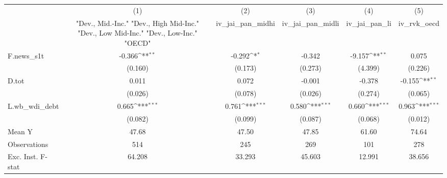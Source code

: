 {
\def\sym#1{\ifmmode^{#1}\else\(^{#1}\)\fi}
\begin{tabular}{l*{5}{c}}
\toprule
            &\multicolumn{1}{c}{(1)}&\multicolumn{1}{c}{(2)}&\multicolumn{1}{c}{(3)}&\multicolumn{1}{c}{(4)}&\multicolumn{1}{c}{(5)}\\
            &\multicolumn{1}{c}{ "Dev., Mid.-Inc." "Dev., High Mid-Inc." "Dev., Low Mid-Inc." "Dev., Low-Inc." "OECD" }&\multicolumn{1}{c}{iv\_jai\_pan\_midhi}&\multicolumn{1}{c}{iv\_jai\_pan\_midli}&\multicolumn{1}{c}{iv\_jai\_pan\_li}&\multicolumn{1}{c}{iv\_rvk\_oecd}\\
\midrule
F.news\_s1t  &      -0.366\sym{**} &      -0.292\sym{*}  &      -0.342         &      -9.157\sym{**} &       0.075         \\
            &     (0.160)         &     (0.173)         &     (0.273)         &     (4.399)         &     (0.226)         \\
\addlinespace
D.tot       &       0.011         &       0.072         &      -0.001         &      -0.378         &      -0.155\sym{**} \\
            &     (0.026)         &     (0.078)         &     (0.026)         &     (0.274)         &     (0.065)         \\
\addlinespace
L.wb\_wdi\_debt&       0.665\sym{***}&       0.761\sym{***}&       0.580\sym{***}&       0.660\sym{***}&       0.963\sym{***}\\
            &     (0.082)         &     (0.099)         &     (0.087)         &     (0.068)         &     (0.012)         \\
\midrule
Mean Y      &       47.68         &       47.50         &       47.85         &       61.60         &       74.64         \\
Observations&         514         &         245         &         269         &         101         &         278         \\
Exc. Inst. F-stat&      64.208         &      33.293         &      45.603         &      12.991         &      38.656         \\
\bottomrule
\end{tabular}
}

